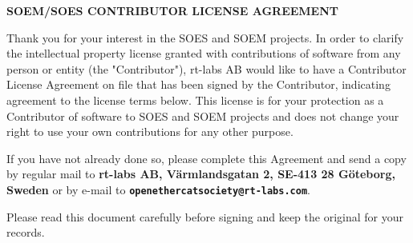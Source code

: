 \documentclass[10pt,a4paper]{letter}
\begin{document}
\medskip

\begin{center}
   \Large{\textbf{SOEM/SOES CONTRIBUTOR LICENSE AGREEMENT}}
\end{center}

Thank you for your interest in the SOES and SOEM projects. In order to clarify
the intellectual property license granted with contributions of software from
any person or entity (the "Contributor"), rt-labs AB would like to have
a Contributor License Agreement on file that has been signed by the Contributor,
indicating agreement to the license terms below. This license is for your
protection as a Contributor of software to SOES and SOEM projects and does not
change your right to use your own contributions for any other purpose.

If you have not already done so, please complete this Agreement and send a copy
by regular mail to \textbf{rt-labs AB, Värmlandsgatan 2, SE-413 28 Göteborg,
   Sweden} or by e-mail to \textbf{\texttt{openethercatsociety@rt-labs.com}}.

Please read this document carefully before signing and keep the original for
your records.


\medskip
\end{document}
